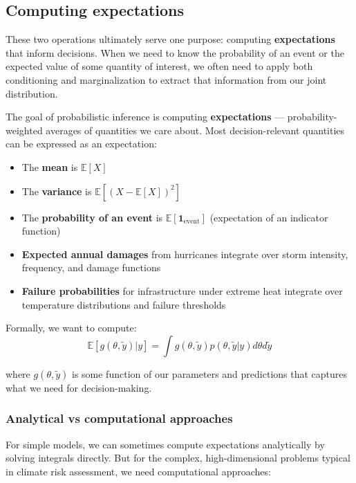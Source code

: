 \documentclass[
  letterpaper,
  DIV=11,
  numbers=noendperiod]{scrreprt}
\providecommand{\tightlist}{%
  \setlength{\itemsep}{0pt}\setlength{\parskip}{0pt}}
\begin{document}
\subsection{Computing expectations}\label{computing-expectations}

These two operations ultimately serve one purpose: computing
\textbf{expectations} that inform decisions. When we need to know the
probability of an event or the expected value of some quantity of
interest, we often need to apply both conditioning and marginalization
to extract that information from our joint distribution.

The goal of probabilistic inference is computing \textbf{expectations}
--- probability-weighted averages of quantities we care about. Most
decision-relevant quantities can be expressed as an expectation:

\begin{itemize}
\tightlist
\item
  The \textbf{mean} is \(\mathbb{E}[X]\)
\item
  The \textbf{variance} is \(\mathbb{E}[(X - \mathbb{E}[X])^2]\)
\item
  The \textbf{probability of an event} is
  \(\mathbb{E}[\mathbf{1}_{\text{event}}]\) (expectation of an indicator
  function)
\item
  \textbf{Expected annual damages} from hurricanes integrate over storm
  intensity, frequency, and damage functions
\item
  \textbf{Failure probabilities} for infrastructure under extreme heat
  integrate over temperature distributions and failure thresholds
\end{itemize}

Formally, we want to compute:
\[\mathbb{E}[g(\theta, \tilde{y}) | y] = \int g(\theta, \tilde{y}) p(\theta, \tilde{y} | y) d\theta d\tilde{y}\]

where \(g(\theta, \tilde{y})\) is some function of our parameters and
predictions that captures what we need for decision-making.

\subsubsection{Analytical vs computational
approaches}\label{analytical-vs-computational-approaches}

For simple models, we can sometimes compute expectations analytically by
solving integrals directly. But for the complex, high-dimensional
problems typical in climate risk assessment, we need computational
approaches:
\end{document}
